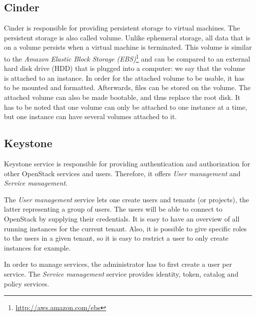 \subsection{Cinder}
Cinder is responsible for providing persistent storage to virtual machines. 
The persistent storage is also called volume. 
Unlike ephemeral storage, all data that is on a volume persists when a virtual machine is terminated. 
This volume is similar to the \textit{Amazon Elastic Block Storage (EBS)}\footnote{\url{http://aws.amazon.com/ebs}} 
and can be compared to an external hard disk drive (HDD) that is plugged into a computer: we say that the volume is attached to an instance. 
In order for the attached volume to be usable, it has to be mounted and formatted. 
Afterwards, files can be stored on the volume. 
The attached volume can also be made bootable, and thus replace the root disk.
It has to be noted that one volume can only be attached to one instance at a time, but one instance can have several volumes attached to it.


\subsection{Keystone}
Keystone service is responsible for providing authentication and authorization for other OpenStack services and users. 
Therefore, it offers \textit{User management} and \textit{Service management}. 

The \textit{User management} service lets one create users and tenants (or projects), the latter representing a group of users. 
The users will be able to connect to OpenStack by supplying their credentials.
It is easy to have an overview of all running instances for the current tenant.
Also, it is possible to give specific roles to the users in a given tenant, so it is easy to restrict a user to only create instances for example. 

In order to manage services, the administrator has to first create a user per service. 
The \textit{Service management} service provides identity, token, catalog and policy services.



